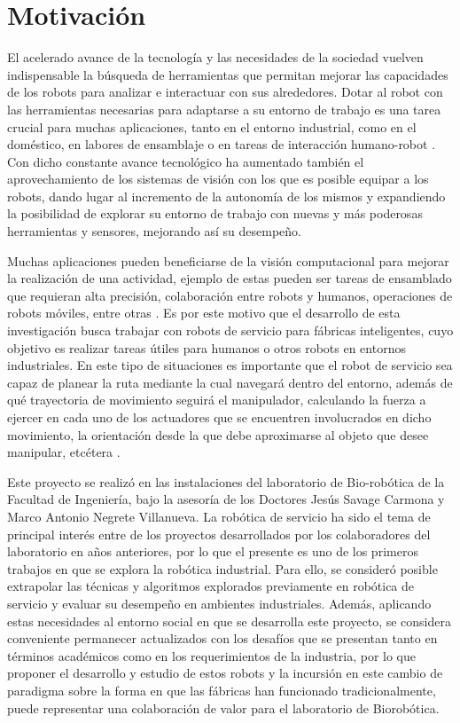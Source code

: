 \newpage
\section{Motivación}
El acelerado avance de la tecnología y las necesidades de la sociedad vuelven indispensable la búsqueda de herramientas que permitan mejorar las capacidades de los robots para analizar e interactuar con sus alrededores. Dotar al robot con las herramientas necesarias para adaptarse a su entorno de trabajo es una tarea crucial para muchas aplicaciones, tanto en el entorno industrial, como en el doméstico, en labores de ensamblaje o en tareas de interacción humano-robot \cite{roveda_robot_2022}. Con dicho constante avance tecnológico ha aumentado también el aprovechamiento de los sistemas de visión con los que es posible  equipar a los robots, dando lugar al incremento de la autonomía de los mismos y expandiendo la posibilidad de explorar su entorno de trabajo con nuevas y más poderosas herramientas y sensores, mejorando así su desempeño.


Muchas aplicaciones pueden beneficiarse de la visión computacional para mejorar la realización de una actividad, ejemplo de estas pueden ser tareas de ensamblado que requieran alta precisión, colaboración entre robots y humanos, operaciones de robots móviles, entre otras \cite{ROVEDA2021103711}. Es por este motivo que el desarrollo de esta investigación busca trabajar con robots de servicio para fábricas inteligentes, cuyo objetivo es realizar tareas útiles para humanos o otros robots en entornos industriales. En este tipo de situaciones es importante que el robot de servicio sea capaz de planear la ruta mediante la cual navegará dentro del entorno, además de qué trayectoria de movimiento seguirá el manipulador, calculando la fuerza a ejercer en cada uno de los actuadores que se encuentren involucrados en dicho movimiento, la orientación desde la que debe aproximarse al objeto que desee manipular, etcétera \cite{Rosenbaum2006}.


Este proyecto se realizó en las instalaciones del laboratorio de Bio-robótica de la Facultad de Ingeniería, bajo la asesoría de los Doctores Jesús Savage Carmona y Marco Antonio Negrete Villanueva. La robótica de servicio ha sido el tema de principal interés entre de los proyectos desarrollados por los colaboradores del laboratorio en años anteriores, por lo que el presente es uno de los primeros trabajos en que se explora la robótica industrial. Para ello, se consideró posible extrapolar las técnicas y algoritmos explorados previamente en robótica de servicio y evaluar su desempeño en ambientes industriales. Además, aplicando estas necesidades al entorno social en que se desarrolla este proyecto, se considera conveniente permanecer actualizados con los desafíos que se presentan tanto en términos académicos como en los requerimientos de la industria, por lo que proponer el desarrollo y estudio de estos robots y la incursión en este cambio de paradigma sobre la forma en que las fábricas han funcionado tradicionalmente, puede representar una colaboración de valor para el laboratorio de Biorobótica.

